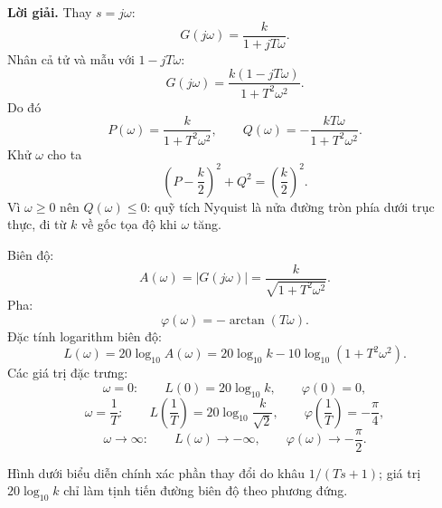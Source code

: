 \documentclass[11pt,a4paper]{article}
\newcommand{\loigiai}{\par\smallskip\noindent\textbf{Lời giải.}\enspace}
\begin{document}
\loigiai
Thay \(s=j\omega\):
\[
G(j\omega)=\frac{k}{1+jT\omega}.
\]
Nhân cả tử và mẫu với \(1-jT\omega\):
\[
G(j\omega)
=
\frac{k(1-jT\omega)}{1+T^2\omega^2}.
\]
Do đó
\[
\boxed{
P(\omega)=\frac{k}{1+T^2\omega^2},
\qquad
Q(\omega)=-\frac{kT\omega}{1+T^2\omega^2}.
}
\]
Khử \(\omega\) cho ta
\[
\boxed{
\left(P-\frac{k}{2}\right)^2+Q^2
=
\left(\frac{k}{2}\right)^2.
}
\]
Vì \(\omega\ge0\) nên \(Q(\omega)\le0\): quỹ tích Nyquist là nửa đường tròn phía dưới trục thực, đi từ \(k\) về gốc tọa độ khi \(\omega\) tăng.

\begin{center}
\end{center}

Biên độ:
\[
\boxed{
A(\omega)=|G(j\omega)|
=\frac{k}{\sqrt{1+T^2\omega^2}}.
}
\]
Pha:
\[
\boxed{
\varphi(\omega)=-\arctan(T\omega).
}
\]
Đặc tính logarithm biên độ:
\[
\boxed{
L(\omega)=20\log_{10}A(\omega)
=
20\log_{10}k
-10\log_{10}\!\left(1+T^2\omega^2\right).
}
\]
Các giá trị đặc trưng:
\[
\omega=0:
\qquad
L(0)=20\log_{10}k,\qquad
\varphi(0)=0,
\]
\[
\omega=\frac1T:
\qquad
L\!\left(\frac1T\right)
=
20\log_{10}\frac{k}{\sqrt2},
\qquad
\varphi\!\left(\frac1T\right)=-\frac{\pi}{4},
\]
\[
\omega\to\infty:
\qquad
L(\omega)\to-\infty,\qquad
\varphi(\omega)\to-\frac{\pi}{2}.
\]

Hình dưới biểu diễn chính xác phần thay đổi do khâu \(1/(Ts+1)\); giá trị \(20\log_{10}k\) chỉ làm tịnh tiến đường biên độ theo phương đứng.
\end{document}
